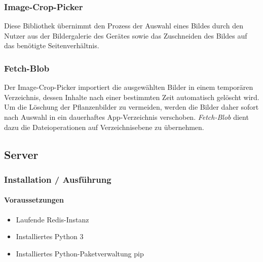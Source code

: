         \subsubsection*{Image-Crop-Picker}
        Diese Bibliothek übernimmt den Prozess der Auswahl eines Bildes durch den Nutzer aus der Bildergalerie des Gerätes sowie das Zuschneiden des Bildes auf das benötigte Seitenverhältnis.
        
        \subsubsection*{Fetch-Blob}
        Der Image-Crop-Picker importiert die ausgewählten Bilder in einem temporären Verzeichnis, dessen Inhalte nach einer bestimmten Zeit automatisch gelöscht wird. Um die Löschung der Pflanzenbilder zu vermeiden, werden die Bilder daher sofort nach Auswahl in ein dauerhaftes App-Verzeichnis verschoben. \textit{Fetch-Blob} dient dazu die Dateioperationen auf Verzeichnisebene zu übernehmen. 

\subsection{Server}
    
    \subsubsection{Installation / Ausführung}
        \paragraph*{Voraussetzungen}
            \begin{itemize}
                \item Laufende Redis-Instanz
                \item Installiertes Python 3 
                \item Installiertes Python-Paketverwaltung pip
            \end{itemize}
        
